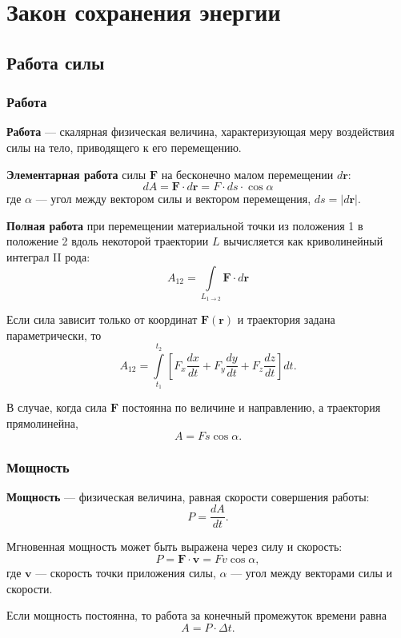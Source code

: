 \section{Закон сохранения энергии}

\subsection{Работа силы}

\subsubsection{Работа}

\textbf{Работа} — скалярная физическая величина, характеризующая меру воздействия силы на тело, приводящего к его перемещению.

\textbf{Элементарная работа} силы \(\mathbf{F}\) на бесконечно малом перемещении \(d\mathbf{r}\):
\[
dA = \mathbf{F} \cdot d\mathbf{r} = F \cdot ds \cdot \cos\alpha
\]
где \(\alpha\) — угол между вектором силы и вектором перемещения, \(ds = |d\mathbf{r}|\).

\textbf{Полная работа} при перемещении материальной точки из положения 1 в положение 2 вдоль некоторой траектории \(L\) вычисляется как криволинейный интеграл II рода:
\[
A_{12} = \int\limits_{L_{1\to2}} \mathbf{F} \cdot d\mathbf{r}
\]

Если сила зависит только от координат \(\mathbf{F}(\mathbf{r})\) и траектория задана параметрически, то
\[
A_{12} = \int\limits_{t_1}^{t_2} \left[ F_x\frac{dx}{dt} + F_y\frac{dy}{dt} + F_z\frac{dz}{dt} \right] dt.
\]

В случае, когда сила \(\mathbf{F}\) постоянна по величине и направлению, а траектория прямолинейна,
\[
A = F s \cos\alpha.
\]

\subsubsection{Мощность}

\textbf{Мощность} — физическая величина, равная скорости совершения работы:
\[
P = \frac{dA}{dt}.
\]

Мгновенная мощность может быть выражена через силу и скорость:
\[
P = \mathbf{F} \cdot \mathbf{v} = F v \cos\alpha,
\]
где \(\mathbf{v}\) — скорость точки приложения силы, \(\alpha\) — угол между векторами силы и скорости.

Если мощность постоянна, то работа за конечный промежуток времени равна
\[
A = P \cdot \Delta t.
\]

